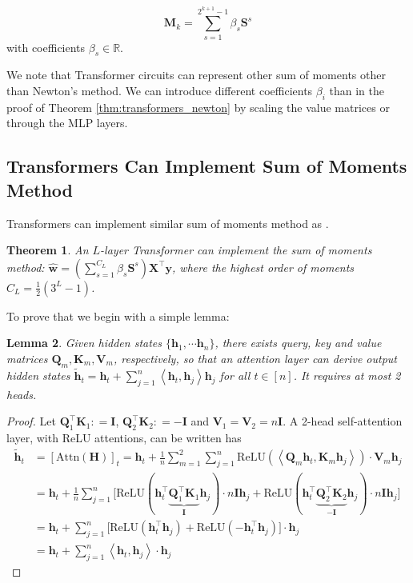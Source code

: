 \documentclass[11pt]{article}
\theoremstyle{plain}
\newtheorem{theorem}{Theorem}[section]
\newtheorem{lemma}[theorem]{Lemma}
\theoremstyle{definition}
\theoremstyle{remark}
\renewcommand{\^}[1]{^{(#1)}}
\newcommand{\bh}{\boldsymbol{h}}
\newcommand{\bK}{\boldsymbol{K}}
\newcommand{\bX}{\boldsymbol{X}}
\newcommand{\bM}{\boldsymbol{M}}
\newcommand{\by}{\boldsymbol{y}}
\newcommand{\bH}{\boldsymbol{H}}
\newcommand{\bQ}{\boldsymbol{Q}}
\newcommand{\bI}{\boldsymbol{I}}
\newcommand{\bS}{\boldsymbol{S}}
\newcommand{\bw}{\boldsymbol{w}}
\newcommand{\bV}{\boldsymbol{V}}
\newcommand{\inner}[1]{ \left\langle {#1} \right\rangle }
\begin{document}
\begin{equation}
    \bM_k = \sum_{s=1}^{2^{k+1} - 1} \beta_s \bS^s
\label{eqn:som}
\end{equation}
with coefficients $\beta_s \in \mathbb R$.

We note that Transformer circuits can represent other sum of moments other than Newton's method. We can introduce different coefficients $\beta_i$ than in the proof of Theorem \ref{thm:transformers_newton} by scaling the value matrices or through the MLP layers. 

\iffalse

\subsection{Transformers Can Implement Sum of Moments Method}
Transformers can implement similar sum of moments method as . 
\begin{theorem}\label{thm:tf_som}
    An $L$-layer Transformer can implement the sum of moments method: $\displaystyle \hat{\bw} = \left(\sum_{s=1}^{C_{L}} \beta_s \bS^s\right) \bX^\top \by$, where the highest order of moments $C_L = \frac{1}{2} \left(3^L - 1\right)$.
\end{theorem}

To prove that we begin with a simple lemma:

\begin{lemma}
  \label{lemma:inner_product}
    Given hidden states $\{\bh_1, \cdots \bh_n\}$, there exists query, key and value matrices $\bQ_m, \bK_m, \bV_m$, respectively, so that an attention layer can derive output hidden states $\tilde{\bh}_t = \bh_t +\sum_{j=1}^n \inner {\bh_t, \bh_j} \bh_j$ for all $t \in [n]$. It requires at most 2 heads.   
\end{lemma}
\begin{proof}
        Let $\bQ_1^\top \bK_1 : = \bI$, $\bQ_2^\top \bK_2 : = -\bI$ and $\bV_1 = \bV_2 = n\bI$. A 2-head self-attention layer, with ReLU attentions, can be written has 
    \begin{equation}
    \begin{aligned}
        \tilde{\bh}_t &= [\mathrm{Attn}(\bH)]_t = \bh_t + \frac{1}{n} \sum_{m=1}^2 \sum_{j=1}^n \mathrm{ReLU} \left(\inner{\bQ_m \bh_t, \bK_m \bh_j}\right) \cdot \bV_m \bh_j \\
        &= \bh_t + \frac{1}{n} \sum_{j=1}^n \Big[\mathrm{ReLU} (\bh_t^\top \underbrace{\bQ_1^\top \bK_1}_{\bI} \bh_j) \cdot n\bI \bh_j  + \mathrm{ReLU} (\bh_t^\top \underbrace{\bQ_2^\top \bK_2}_{-\bI} \bh_j) \cdot n\bI \bh_j  \Big] \\
        &= \bh_t + \sum_{j=1}^n \Big[\mathrm{ReLU} (\bh_t^\top \bh_j) + \mathrm{ReLU} (-\bh_t^\top  \bh_j) \Big] \cdot  \bh_j   \\
        &= \bh_t +  \sum_{j=1}^n \inner{\bh_t, \bh_j} \cdot \bh_j  
    \end{aligned} 
    \end{equation}
\end{proof}
\end{document}
